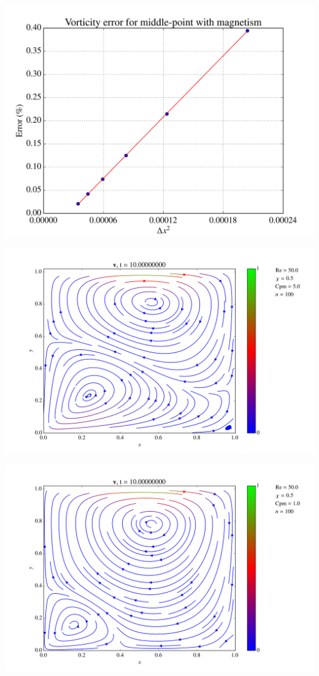 \documentclass[portrait,a0paper,fontscale=0.42]{baposter} %
\begin{document}
\begin{poster}
{\begin{multicols}{2}
\begin{center}
\includegraphics[width=0.8\linewidth]{validateMagnetismRe40.png}
\end{center}

\begin{center}
\includegraphics[width=0.8\linewidth]{simulations/vRe50N100Chi05Cpm5T10fps20.png}
\end{center}

\begin{center}
\includegraphics[width=0.8\linewidth]{simulations/Re50Cpm1.png}
\end{center}


\end{multicols}}
\end{poster}
\end{document}
